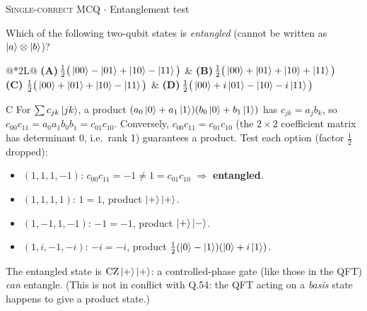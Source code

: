\documentclass[11pt,a4paper]{article}
\newcommand{\optlabel}[1]{\textbf{(#1)}}
\newcommand{\correctlabel}[1]{\textcolor{okgreen}{\textbf{(#1)}\,\ding{51}}}
\newenvironment{qitem}[1]{\begin{list}{}{\setlength{\leftmargin}{3.3em}\setlength{\labelwidth}{3.1em}%
  \setlength{\labelsep}{0.2em}\setlength{\topsep}{3pt}\setlength{\parsep}{3pt}}\item[\textbf{Q.#1}\hfill]}{\end{list}}
\newcommand{\qsep}{\par\vspace{2pt}{\color{black!15}\hrule}\vspace{4pt}}
\newcommand{\qmeta}[2]{{\footnotesize\color{black!60}\textsc{#1} \;$\cdot$\; #2}\par}
\begin{document}
\begin{qitem}{25}
\qmeta{Single-correct MCQ}{Entanglement test}
Which of the following two-qubit states is \emph{entangled} (cannot be written as $\ket{a}\otimes\ket{b}$)?
\par\smallskip\noindent\begin{tabularx}{\linewidth}{@{}*{2}{L}@{}}
\optlabel{A}\,$\frac12\big(\ket{00} - \ket{01} + \ket{10} - \ket{11}\big)$ & \optlabel{B}\,$\frac12\big(\ket{00} + \ket{01} + \ket{10} + \ket{11}\big)$ \\[3pt]
\correctlabel{C}\,$\frac12\big(\ket{00} + \ket{01} + \ket{10} - \ket{11}\big)$ & \optlabel{D}\,$\frac12\big(\ket{00} + i\ket{01} - \ket{10} - i\ket{11}\big)$
\end{tabularx}
\end{qitem}
\begin{solbox}{C}
For $\sum c_{jk}\ket{jk}$, a product $(a_0\ket0 + a_1\ket1)(b_0\ket0 + b_1\ket1)$ has $c_{jk} = a_jb_k$, so
$c_{00}c_{11} = a_0a_1b_0b_1 = c_{01}c_{10}$. Conversely, $c_{00}c_{11} = c_{01}c_{10}$ (the $2\times2$ coefficient matrix has
determinant 0, i.e.\ rank 1) guarantees a product. Test each option (factor $\frac12$ dropped):
\begin{itemize}\itemsep0pt
\item $(1, 1, 1, -1)$: $c_{00}c_{11} = -1 \neq 1 = c_{01}c_{10}$ $\Rightarrow$ \textbf{entangled}.
\item $(1, 1, 1, 1)$: $1 = 1$, product $\ket{+}\ket{+}$.
\item $(1, -1, 1, -1)$: $-1 = -1$, product $\ket{+}\ket{-}$.
\item $(1, i, -1, -i)$: $-i = -i$, product $\frac{1}{2}(\ket0 - \ket1)(\ket0 + i\ket1)$.
\end{itemize}
The entangled state is $\mathrm{CZ}\ket{+}\ket{+}$: a controlled-phase gate (like those in the QFT) \emph{can} entangle.
(This is not in conflict with Q.54: the QFT acting on a \emph{basis} state happens to give a product state.)
\end{solbox}
\qsep
\end{document}
